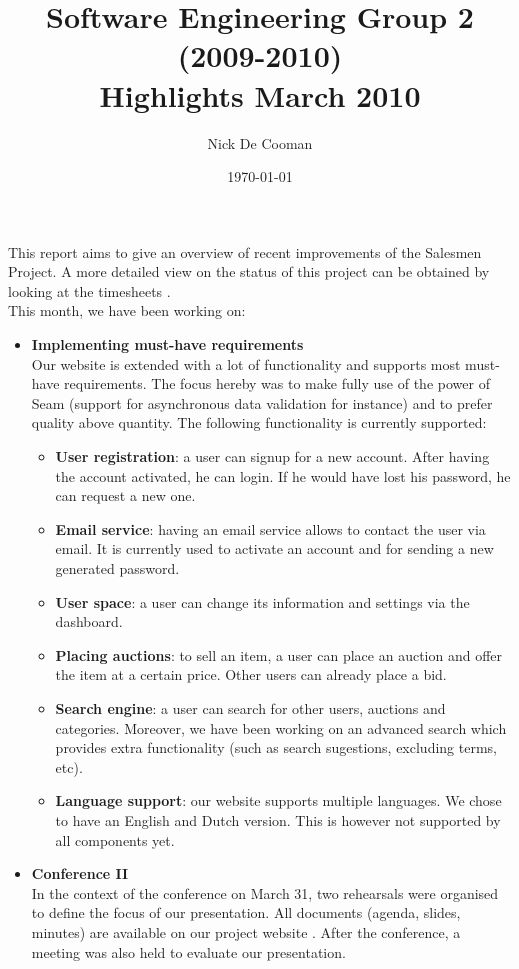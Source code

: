 \documentclass{article}
\begin{document}
	\title{Software Engineering Group 2 (2009-2010) \\ Highlights March 2010}
	\author{Nick De Cooman}
	\date{\today}

\maketitle

This report aims to give an overview of recent improvements of the Salesmen Project. A more detailed view on the status of this project can be obtained by looking at the timesheets \cite{timesheets}. \\

This month, we have been working on:

\begin{itemize}
	
	\item \textbf{Implementing must-have requirements} \\
	Our website \cite{demo} is extended with a lot of functionality and supports most must-have requirements. The focus hereby was to make fully use of the power of Seam (support for asynchronous data validation for instance) and to prefer quality above quantity. The following functionality is currently supported:
	
	\begin{itemize}
		\item \textbf{User registration}: a user can signup for a new account. After having the account activated, he can login. If he would have lost his password, he can request a new one. 
		\item \textbf{Email service}: having an email service allows to contact the user via email. It is currently used to activate an account and for sending a new generated password. 
		\item \textbf{User space}: a user can change its information and settings via the dashboard.
		\item \textbf{Placing auctions}: to sell an item, a user can place an auction and offer the item at a certain price. Other users can already place a bid. 
		\item \textbf{Search engine}: a user can search for other users, auctions and categories. Moreover, we have been working on an advanced search which provides extra functionality (such as search sugestions, excluding terms, etc).  
		\item \textbf{Language support}: our website supports multiple languages. We chose to have an English and Dutch version. This is however not supported by all components yet. 
	\end{itemize}
	
	\item \textbf{Conference II} \\
	In the context of the conference on March 31, two rehearsals were organised to define the focus of our presentation. All documents (agenda, slides, minutes) are available on our project website \cite{conference}. After the conference, a meeting was also held to evaluate our presentation. 

\end{itemize}
\end{document}
